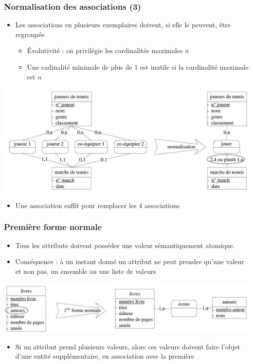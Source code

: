 \begin{frame}
  \frametitle{Normalisation des associations (3)}
  \begin{itemize}
    \item Les associations en plusieurs exemplaires doivent, si elle le peuvent, être regroupée
      \begin{itemize}
        \item Évolutivité : on privilégie les cardinalités maximales $n$
        \item Une cadinalité minimale de plus de $1$ est inutile si la cardinalité maximale est $n$
      \end{itemize}
  \end{itemize}
  \begin{center}
    \includegraphics[width=0.9\linewidth]{association_plusieurs_exemplaires.jpg}
  \end{center}
  \begin{itemize}
    \item Une association suffit pour remplacer les 4 associations
  \end{itemize}
\end{frame}


\begin{frame}
  \frametitle{Première forme normale}
  \begin{itemize}
    \item Tous les attributs doivent posséder une valeur sémantiquement
        atomique.
    \item Conséquence : à un instant donné un attribut ne peut prendre qu'une
        valeur et non pas, un ensemble ou une liste de valeurs
  \end{itemize}
  \begin{center}
    \includegraphics[width=0.9\linewidth]{premiere_forme_normale.jpg}
  \end{center}
  \begin{itemize}
    \item Si un attribut prend plusieurs valeurs, alors ces valeurs doivent faire l'objet d'une entité
      supplémentaire, en association avec la première
  \end{itemize}
\end{frame}

